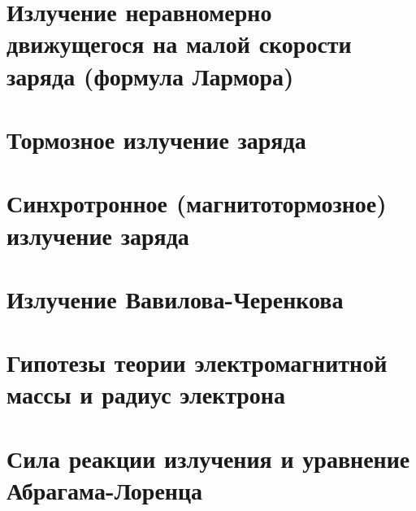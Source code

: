 \begin{multicols*}{5}
		\section{Излучение неравномерно движущегося на малой скорости заряда (формула Лармора)}
		\section{Тормозное излучение заряда}
		\section{Синхротронное (магнитотормозное) излучение заряда}
		\section{Излучение Вавилова-Черенкова}
		\section{Гипотезы теории электромагнитной массы и радиус электрона}
		\section{Сила реакции излучения и уравнение Абрагама-Лоренца}
	\end{multicols*}
